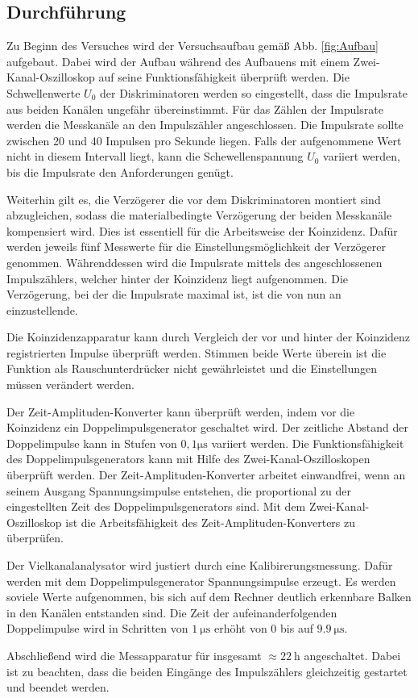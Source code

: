 \subsection{Durchführung}

Zu Beginn des Versuches wird der Versuchsaufbau gemäß Abb. \ref{fig:Aufbau} aufgebaut.
Dabei wird der Aufbau während des Aufbauens mit einem Zwei-Kanal-Oszilloskop
auf seine Funktionsfähigkeit überprüft werden.
Die Schwellenwerte $U_0$ der Diskriminatoren werden so eingestellt, dass
die Impulsrate aus beiden Kanälen ungefähr übereinstimmt. Für das Zählen der
Impulsrate werden die Messkanäle an den Impulszähler angeschlossen.
Die Impulsrate sollte zwischen 20 und 40 Impulsen pro Sekunde liegen.
Falls der aufgenommene Wert nicht in diesem Intervall liegt, kann die
Schewellenspannung $U_0$ variiert werden, bis die Impulsrate den Anforderungen genügt.

Weiterhin gilt es, die Verzögerer die vor dem Diskriminatoren montiert sind
abzugleichen, sodass die materialbedingte Verzögerung der beiden Messkanäle
kompensiert wird. Dies ist essentiell für die Arbeitsweise der Koinzidenz.
Dafür werden jeweils fünf Messwerte für die Einstellungsmöglichkeit der Verzögerer genommen.
Währenddessen wird die Impulsrate mittels des angeschlossenen Impulszählers, welcher hinter
der Koinzidenz liegt aufgenommen.
Die Verzögerung, bei der die Impulsrate maximal ist, ist die von nun an einzustellende.

Die Koinzidenzapparatur kann durch Vergleich der vor und hinter der Koinzidenz
registrierten Impulse überprüft werden. Stimmen beide Werte überein ist
die Funktion als Rauschunterdrücker nicht gewährleistet und die Einstellungen müssen
verändert werden.

Der Zeit-Amplituden-Konverter kann überprüft werden, indem vor die Koinzidenz ein
Doppelimpulsgenerator geschaltet wird. Der zeitliche Abstand der
Doppelimpulse kann in Stufen von $0,1\si{\micro\second}$ variiert werden.
Die Funktionsfähigkeit des Doppelimpulsgenerators kann mit Hilfe des
Zwei-Kanal-Oszilloskopen überprüft werden.
Der Zeit-Amplituden-Konverter arbeitet einwandfrei, wenn an seinem
Ausgang Spannungsimpulse entstehen, die proportional zu der
eingestellten Zeit des Doppelimpulsgenerators sind. Mit dem Zwei-Kanal-Oszilloskop
ist die Arbeitsfähigkeit des Zeit-Amplituden-Konverters zu überprüfen.

Der Vielkanalanalysator wird justiert durch eine Kalibirerungsmessung.
Dafür werden mit dem Doppelimpulsgenerator Spannungsimpulse erzeugt.
Es werden soviele Werte aufgenommen, bis sich auf dem Rechner deutlich
erkennbare Balken in den Kanälen entstanden sind.
Die Zeit der aufeinanderfolgenden Doppelimpulse wird in Schritten von $\SI{1}{\micro\second}$
erhöht von 0 bis auf $\SI{9.9}{\micro\second}$.

Abschließend wird die Messapparatur für insgesamt $\approx \SI{22}{\hour}$
angeschaltet. Dabei ist zu beachten, dass die beiden Eingänge des Impulszählers
gleichzeitig gestartet und beendet werden.

